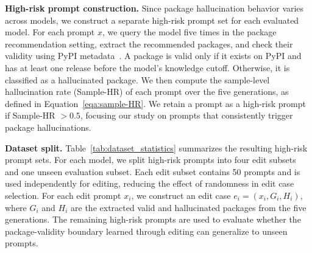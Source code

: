 \noindent{} \textbf{High-risk prompt construction.}
Since package hallucination behavior varies across models, we construct a separate high-risk prompt set for each evaluated model.
For each prompt $x$, we query the model five times in the package recommendation setting, extract the recommended packages, and check their validity using PyPI metadata~\cite{pypi}. 
A package is valid only if it exists on PyPI and has at least one release before the model's knowledge cutoff. Otherwise, it is classified as a hallucinated package.
We then compute the sample-level hallucination rate (Sample-HR) of each prompt over the five generations, as defined in Equation~\ref{eqa:sample-HR}.
We retain a prompt as a high-risk prompt if Sample-HR $>0.5$, focusing our study on prompts that consistently trigger package hallucinations.

\noindent{} \textbf{Dataset split.}
Table~\ref{tab:dataset_statistics} summarizes the resulting high-risk prompt sets. 
For each model, we split high-risk prompts into four edit subsets and one unseen evaluation subset. 
Each edit subset contains 50 prompts and is used independently for editing, reducing the effect of randomness in edit case selection.
For each edit prompt $x_i$, we construct an edit case $e_i=(x_i,G_i,H_i)$, where $G_i$ and $H_i$ are the extracted valid and hallucinated packages from the five generations.
The remaining high-risk prompts are used to evaluate whether the package-validity boundary learned through editing can generalize to unseen prompts.


